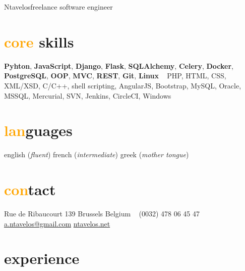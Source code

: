 \documentclass[]{friggeri-cv} %
\begin{document}
 {Ntavelos}{freelance software engineer} %


\begin{aside} %
\section{\textcolor{orange}{core} skills}
\textbf{Pyhton}, \textbf{JavaScript}, \textbf{Django}, \textbf{Flask}, \textbf{SQLAlchemy}, \textbf{Celery}, \textbf{Docker}, \textbf{PostgreSQL}, \textbf{OOP}, \textbf{MVC}, \textbf{REST}, \textbf{Git}, \textbf{Linux}
~
PHP, HTML, CSS, XML/XSD, C/C++, shell scripting, AngularJS, Bootstrap, MySQL, Oracle, MSSQL, Mercurial, SVN, Jenkins, CircleCI, Windows
~~
\section{\textcolor{orange}{lan}guages}
english (\textit{fluent})
french (\textit{intermediate})
greek (\textit{mother tongue})
~
\section{\textcolor{orange}{con}tact}
Rue de Ribaucourt 139
Brussels
Belgium
~
(0032) 478 06 45 47
\href{mailto:a.ntavelos@gmail.com}{a.ntavelos@gmail.com}
\href{http://ntavelos.net}{ntavelos.net}
\end{aside}



\section{experience}
\end{document}

